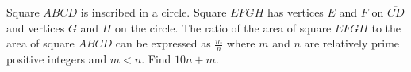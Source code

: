 Square $ABCD$ is inscribed in a circle. Square $EFGH$ has vertices $E$ and $F$ on $\overline{CD}$ and vertices $G$ and $H$ on the circle. The ratio of the area of square $EFGH$ to the area of square $ABCD$ can be expressed as $\frac{m}{n}$ where $m$ and $n$ are relatively prime positive integers and $m<n$. Find $10n+m$.